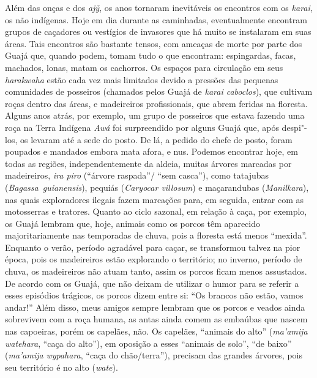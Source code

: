 Além das onças e dos \emph{ajỹ}, os anos tornaram inevitáveis os
encontros com os \emph{karai}, os não indígenas. Hoje em dia durante as
caminhadas, eventualmente encontram grupos de caçadores ou vestígios de
invasores que há muito se instalaram em suas áreas. Tais encontros são
bastante tensos, com ameaças de morte por parte dos Guajá que, quando
podem, tomam tudo o que encontram: espingardas, facas, machados, lonas,
matam os cachorros. Os
espaços para circulação em seus \emph{harakwaha} estão cada vez mais
limitados devido a pressões das pequenas comunidades de posseiros
(chamados pelos Guajá de \emph{karai caboclos}), que cultivam roças
dentro das áreas, e madeireiros profissionais, que abrem feridas na
floresta. Alguns anos atrás, por exemplo, um grupo de posseiros que
estava fazendo uma roça na Terra Indígena \emph{Awá} foi surpreendido
por alguns Guajá que, após despi"-los, os levaram até a sede do posto. De
lá, a pedido do chefe de posto, foram poupados e mandados embora mata
afora, e nus. Podemos encontrar hoje, em todas as regiões,
independentemente da aldeia, muitas árvores marcadas por madeireiros,
\emph{ira piro} (``árvore raspada''/ ``sem casca''), como tatajubas
(\emph{Bagassa~guianensis}), pequiás (\emph{Caryocar villosum}) e
maçarandubas (\emph{Manilkara}), nas quais exploradores ilegais fazem
marcações para, em seguida, entrar com as motosserras e tratores. Quanto
ao ciclo sazonal, em relação à caça, por exemplo, os Guajá lembram que,
hoje, animais como os porcos têm aparecido majoritariamente nas
temporadas de chuva, pois a floresta está menos ``mexida''. Enquanto o
verão, período agradável para caçar, se transformou talvez na pior
época, pois os madeireiros estão explorando o território; no inverno,
período de chuva, os madeireiros não atuam tanto, assim os porcos ficam
menos assustados. De acordo com os Guajá, que não deixam de utilizar o
humor para se referir a esses episódios trágicos, os porcos dizem entre
si: ``Os brancos não estão, vamos andar!'' Além disso, meus amigos
sempre lembram que os porcos e veados ainda sobrevivem com a roça
humana, as antas ainda comem as embaúbas que nascem nas capoeiras, porém
os capelães, não. Os capelães, ``animais do alto'' (\emph{ma'amija
watehara}, ``caça do alto''), em oposição a esses ``animais de solo'', ``de
baixo'' (\emph{ma'amija} \emph{wypahara}, ``caça do chão/terra''), precisam
das grandes árvores, pois seu território é no alto (\emph{wate}).

